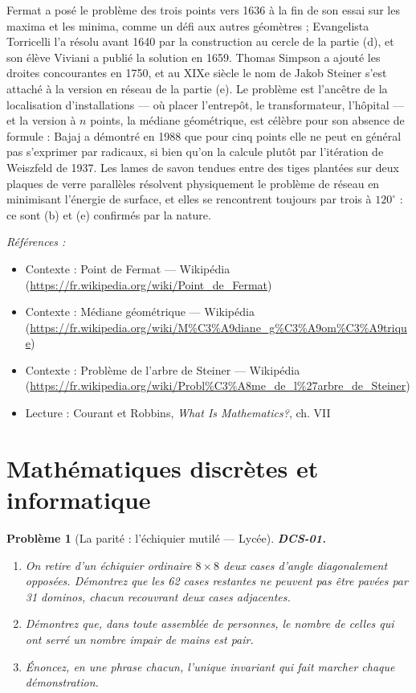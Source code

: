 \documentclass[11pt]{article}
\newtheorem{problem}{Problème}
\newenvironment{refs}{\par\small\noindent\emph{Références :}\begin{itemize}\setlength\itemsep{0pt}}{\end{itemize}\normalsize}
\begin{document}
\noindent Fermat a posé le problème des trois points vers 1636 à la fin de son essai sur les maxima et les minima, comme un défi aux autres géomètres ; Evangelista Torricelli l'a résolu avant 1640 par la construction au cercle de la partie (d), et son élève Viviani a publié la solution en 1659. Thomas Simpson a ajouté les droites concourantes en 1750, et au XIXe siècle le nom de Jakob Steiner s'est attaché à la version en réseau de la partie (e). Le problème est l'ancêtre de la localisation d'installations --- où placer l'entrepôt, le transformateur, l'hôpital --- et la version à $n$ points, la médiane géométrique, est célèbre pour son absence de formule : Bajaj a démontré en 1988 que pour cinq points elle ne peut en général pas s'exprimer par radicaux, si bien qu'on la calcule plutôt par l'itération de Weiszfeld de 1937. Les lames de savon tendues entre des tiges plantées sur deux plaques de verre parallèles résolvent physiquement le problème de réseau en minimisant l'énergie de surface, et elles se rencontrent toujours par trois à $120^\circ$ : ce sont (b) et (e) confirmés par la nature.

\begin{refs}
\item Contexte : Point de Fermat --- Wikipédia (\url{https://fr.wikipedia.org/wiki/Point_de_Fermat})
\item Contexte : Médiane géométrique --- Wikipédia (\url{https://fr.wikipedia.org/wiki/M%C3%A9diane_g%C3%A9om%C3%A9trique})
\item Contexte : Problème de l'arbre de Steiner --- Wikipédia (\url{https://fr.wikipedia.org/wiki/Probl%C3%A8me_de_l%27arbre_de_Steiner})
\item Lecture : Courant et Robbins, \textit{What Is Mathematics?}, ch. VII
\end{refs}

\bigskip


\section*{Mathématiques discrètes et informatique}

\begin{problem}[{La parité : l'échiquier mutilé --- Lycée}]
\textbf{DCS-01.} \begin{enumerate}
\item[(a)] On retire d'un échiquier ordinaire $8 \times 8$ deux cases d'angle diagonalement opposées. Démontrez que les 62 cases restantes ne peuvent pas être pavées par 31 dominos, chacun recouvrant deux cases adjacentes.
\item[(b)] Démontrez que, dans toute assemblée de personnes, le nombre de celles qui ont serré un nombre impair de mains est pair.
\item[(c)] Énoncez, en une phrase chacun, l'unique invariant qui fait marcher chaque démonstration.
\end{enumerate}

\end{problem}
\end{document}
